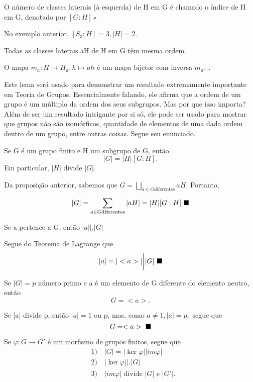 \documentclass[Algebra/algebra_notes.tex]{subfiles}
\begin{document}
\begin{def*}
	O número de classes laterais (\`a esquerda) de H em G é chamado o índice de H em G, denotado por $[G:H].\square$
\end{def*}
\begin{example*}
	No exemplo anterior, $[S_{3} : H]=3, |H| = 2.$
\end{example*}
\begin{lemma*}
	Todas as classes laterais aH de H em G têm mesma ordem.
\end{lemma*}
\begin{proof*}
	O mapa $m_{a}:H\rightarrow H_{a}, h\mapsto ah$ é um mapa bijetor com inversa $m_{a^{-1}}.$ \qedsymbol
\end{proof*}
Este lema será usado para demonstrar um resultado extremamente importante em Teoria de Grupos. Essencialmente falando,
ele afirma que a ordem de um grupo é um múltiplo da ordem dos seus subgrupos. Mas por que isso importa? Além de ser um
resultado intrigante por si só, ele pode ser usado para mostrar que grupos não são isomórficos, quantidade de elementos de
uma dada ordem dentro de um grupo, entre outras coisas. Segue seu enunciado.
\begin{theorem*}
	Se G é um grupo finito e H um subgrupo de G, então
	$$
		|G| = |H|[G:H].
	$$
	Em particular, $|H|$ divide $|G|.$
\end{theorem*}
\begin{proof*}
	Da proposição anterior, sabemos que $G = \bigsqcup_{a\in{G}\text{diferentes}}^{}{aH}.$ Portanto,
	$$
		|G| = \sum\limits_{a\in{G}\text{diferentes}}^{}|aH| = |H|[G:H]\text{ $\blacksquare$}
	$$
\end{proof*}
\begin{crl*}
	Se a pertence a G, então $|a|\biggl|\biggr.|G|$
\end{crl*}
\begin{proof*}
	Segue do Teorema de Lagrange que
	$$
		|a|=|<a>|\biggl|_{}^{}\biggr.|G|\text{ $\blacksquare$}
	$$
\end{proof*}
\begin{crl*}
	Se $|G|=p$ número primo e a é um elemento de G diferente do elemento neutro, então
	$$
		G = <a>.
	$$
\end{crl*}
\begin{proof*}
	Se |a| divide p, então $|a|=1$ ou p, mas, como $a\neq 1, |a| = p,$ segue que
	$$
		G = <a>\text{ $\blacksquare$}
	$$
\end{proof*}
\begin{crl*}
	Se $\varphi:G\rightarrow G'$ é um morfismo de grupos finitos, segue que
	\begin{align*}
		 & 1)\quad |G| = |\ker{\varphi}||im\varphi|              \\
		 & 2)\quad |\ker{\varphi}| \biggl|_{}^{}\biggr. |G|      \\
		 & 3)\quad |im\varphi|\text{ divide } |G|\text{ e }|G'|.
	\end{align*}
\end{crl*}
\end{document}
